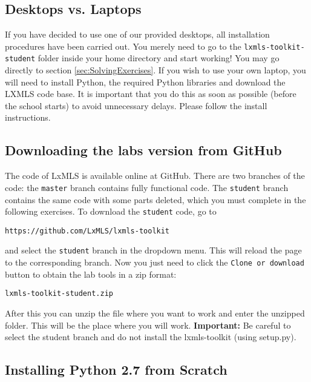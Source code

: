 \subsection{Desktops vs. Laptops}

If you have decided to use one of our provided desktops, all installation procedures have been carried out. You merely need to go to the \verb+lxmls-toolkit-student+ folder inside your home directory and start working! You may go directly to section \ref{sec:SolvingExercises}. If you wish to use your own laptop, you will need to install Python, the required Python libraries and download the LXMLS code base. It is important that you do this as soon as possible (before the school starts) to avoid unnecessary delays. Please follow the install instructions. 

\subsection{Downloading the labs version from GitHub}

The code of LxMLS is available online at GitHub. There are two branches of the code: the \verb+master+ branch contains fully functional code. The \verb+student+ branch contains the same code with some parts deleted, which you must complete in the following exercises. To download the \verb+student+ code, go to

\begin{verbatim}
https://github.com/LxMLS/lxmls-toolkit
\end{verbatim}

\noindent and select the \verb+student+ branch in the dropdown menu. This will reload the page to the corresponding branch. Now you just need to click the \verb+Clone or download + button to obtain the lab tools in a zip format:

\begin{verbatim}
lxmls-toolkit-student.zip
\end{verbatim}

After this you can unzip the file where you want to work and enter the unzipped folder. This will be the place where you will work. \textbf{Important:} Be careful to select the student branch and do not install the lxmls-toolkit (using setup.py).

\subsection{Installing Python 2.7 from Scratch}

